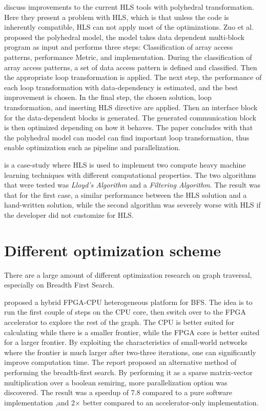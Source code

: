 \cite{Zuo:2013:IHL:2435264.2435271} discuss improvements to the current HLS tools with polyhedral transformation. Here they present a problem with HLS, which is that unless the code is inherently compatible, HLS can not apply most of the optimizations. Zuo et al. proposed the polyhedral model, the model takes data dependent multi-block program as input and performs three steps: Classification of array access patterns, performance Metric, and implementation. During the classification of array access patterns, a set of data access pattern is defined and classified. Then the appropriate loop transformation is applied. The next step, the performance of each loop transformation with data-dependency is estimated, and the best improvement is chosen. In the final step, the chosen solution, loop transformation, and inserting HLS directive are applied. Then an interface block for the data-dependent blocks is generated. The generated communication block is then optimized depending on how it behaves. The paper concludes with that the polyhedral model can model can find important loop transformation, thus enable optimization such as pipeline and parallelization.

\cite{6718388} is a case-study where HLS is used to implement two compute heavy machine learning techniques with different computational properties. The two algorithms that were tested was \textit{Lloyd's Algorithm} and a \textit{Filtering Algorithm}. The result was that for the first case, a similar performance between the HLS solution and a hand-written solution, while the second algorithm was severely worse with HLS if the developer did not customize for HLS.
 
\section{Different optimization scheme}
There are a large amount of different optimization research on graph traversal, especially on Breadth First Search. 

\citep{HybridBFS2015} proposed a hybrid FPGA-CPU heterogeneous platform for BFS. The idea is to run the first couple of steps on the CPU core, then switch over to the FPGA accelerator to explore the rest of the graph. The CPU is better suited for calculating while there is a smaller frontier, while the FPGA core is better suited for a larger frontier. By exploiting the characteristics of small-world networks where the frontier is much larger after two-three iterations, one can significantly improve computation time. The report proposed an alternative method of performing the breadth-first search. By performing it as a sparse matrix-vector multiplication over a boolean semiring, more parallelization option was discovered. The result was a speedup of 7.8 compared to a pure software implementation ,and 2$\times$ better compared to an accelerator-only implementation. 
 
